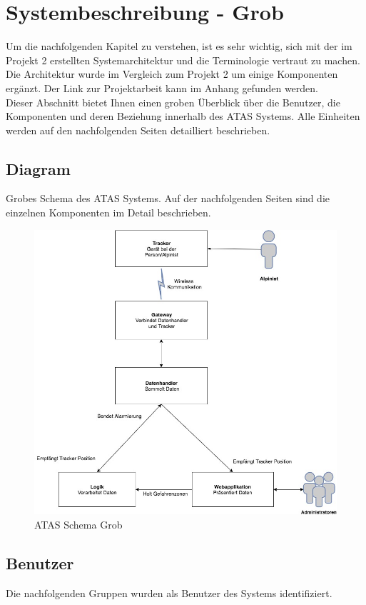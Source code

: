 \documentclass[11pt,english,german]{report}
\theoremstyle{definition}
\begin{document}
\chapter{Systembeschreibung - Grob}
Um die nachfolgenden Kapitel zu verstehen, ist es sehr wichtig, sich mit der im Projekt 2 erstellten Systemarchitektur und die Terminologie vertraut zu machen. Die Architektur wurde im Vergleich zum Projekt 2 um einige Komponenten ergänzt. Der Link zur Projektarbeit kann im Anhang gefunden werden.\\[0.3cm]
Dieser Abschnitt bietet Ihnen einen groben Überblick über die Benutzer, die Komponenten und deren Beziehung innerhalb des ATAS Systems. Alle Einheiten werden auf den nachfolgenden Seiten detailliert beschrieben.

\newpage
\section{Diagram}
Grobes Schema des ATAS Systems. Auf der nachfolgenden Seiten sind die einzelnen Komponenten im Detail beschrieben.\\[0.3cm]
\begin{figure}[H]
	\centering
	\includegraphics[width=\textwidth]{img/system/ATAS_SystemOverview_Abstract_BA.jpg}
	\caption[ATAS Schema Grob]
	{ATAS Schema Grob}
\end{figure}

\newpage
\section{Benutzer}
Die nachfolgenden Gruppen wurden als Benutzer des Systems identifiziert.
\end{document}
